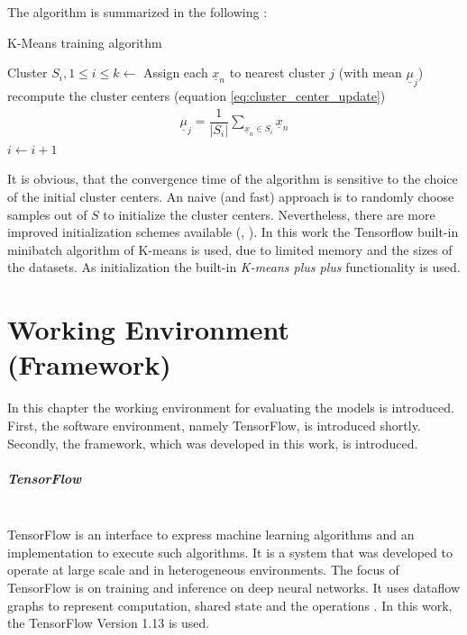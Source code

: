 \documentclass[12pt,DIV14,BCOR12mm,a4paper,footexclude,headinclude,halfparskip-,twoside,openright,cleardoubleempty,idxtotoc,bibtotoc,listtotoc,abstracton]{scrreprt} %
\numberwithin{equation}{chapter}
\begin{document}
The algorithm is summarized in the following \cite{LectureNotes_DPR}:
\begin{algorithm}
\caption{K-Means training algorithm}
\begin{algorithmic}
\State Cluster $S_i, 1 \leq i \leq k \gets$ Assign each $\underline{x}_n$ to nearest cluster $j$ (with mean $\underline{\mu}_j$)
\State recompute the cluster centers (equation \ref{eq:cluster_center_update}) 
\begin{align} 
\underline{\mu}_{j} = \dfrac{1}{|S_{i}|} \sum_{\underline{x}_{n} \in S_{i}}\underline{x}_{n}\label{eq:cluster_center_update}
\end{align}
\State $i \gets i+1$
\EndWhile
\end{algorithmic}
\end{algorithm}
It is obvious, that the convergence time of the algorithm is sensitive to the choice of the initial cluster centers. An naive (and fast) approach is to randomly choose samples out of $S$ to initialize the cluster centers. Nevertheless, there are more improved initialization schemes available (\cite{Yi10ImprovedInitialization}, \cite{Arthuer07kmeans_plusplus}). In this work the Tensorflow built-in minibatch algorithm of K-means is used, due to limited memory and the sizes of the datasets. As initialization the built-in \textit{K-means plus plus} functionality is used.
\chapter{Working Environment (Framework)}
In this chapter the working environment for evaluating the models is introduced. First, the software environment, namely TensorFlow, is introduced shortly. Secondly, the framework, which was developed in this work, is introduced.
\paragraph{TensorFlow}\mbox{}\\
TensorFlow is an interface to express machine learning algorithms and an implementation to execute such algorithms. It is a system that was developed to operate at large scale and in heterogeneous environments. The focus of TensorFlow is on training and inference on deep neural networks. It uses dataflow graphs to represent computation, shared state and the operations \cite{tensorflow2015-whitepaper}. In this work, the TensorFlow Version 1.13 is used.
\end{document}
